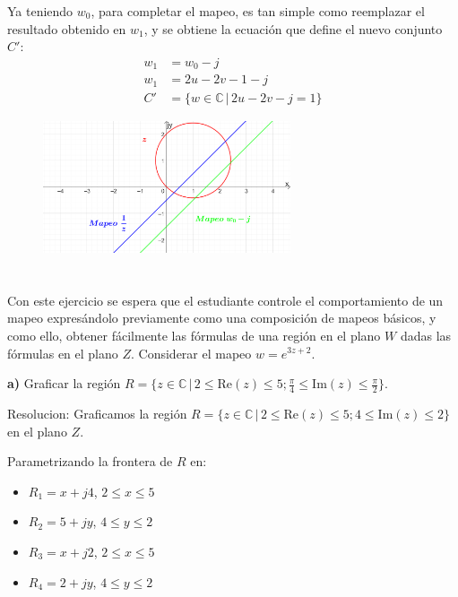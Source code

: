 \documentclass[12pt]{report}
\begin{document}
Ya teniendo $w_0$, para completar el mapeo, es tan simple como reemplazar el resultado obtenido en $w_1$, y se obtiene la ecuación que define el nuevo conjunto \( C' \):\\
 
 
\begin{align*}
w_1 &= w_0-j \\[5pt]
w_1 &= 2u-2v-1-j \\[5pt]
C' &= \{w \in \mathbb{C} \, | \, 2u-2v-j=1\}
\end{align*}
 
 
\begin{figure}[htbp] %
    \centering %
    \includegraphics[width=0.65\textwidth]{./Imagenes/foto2Ej3.png} %
\end{figure}

\clearpage

\chapter{}%

Con este ejercicio se espera que el estudiante controle el comportamiento de un mapeo expresándolo previamente como una composición de mapeos básicos, y como ello, obtener fácilmente las fórmulas de una región en el plano $W$ dadas las fórmulas en el plano $Z$. Considerar el mapeo $w = e^{3z + 2}$.

\textbf{a)} Graficar la región $R = \{z \in \mathbb{C} \, | \, 2 \leq \text{Re}(z) \leq 5; \frac{\pi}{4} \leq \text{Im}(z) \leq \frac{\pi}{2}\}$.

Resolucion:
Graficamos la región $R = \{z \in \mathbb{C} \, | \, 2 \leq \text{Re}(z) \leq 5; 4 \leq \text{Im}(z) \leq 2\}$ en el plano $Z$.

Parametrizando la frontera de $R$ en:
\begin{itemize}
    \item $R_1 = x + j4$, $2 \leq x \leq 5$
    \item $R_2 = 5 + jy$, $4 \leq y \leq 2$
    \item $R_3 = x + j2$, $2 \leq x \leq 5$
    \item $R_4 = 2 + jy$, $4 \leq y \leq 2$
\end{itemize}
\end{document}
